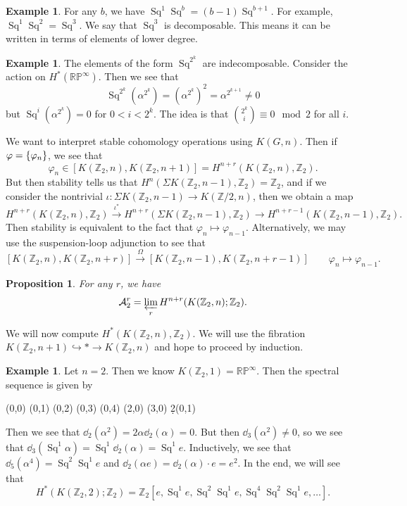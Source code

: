 \documentclass[leqno, openany]{memoir}
\newtheorem{prop}[thm]{Proposition}
\theoremstyle{definition}
\newtheorem{exm}[thm]{Example}
\theoremstyle{remark}
\theoremstyle{plain}
\theoremstyle{definition}
\theoremstyle{remark}
\newcommand{\R}{\mathbb{R}}
\newcommand{\Z}{\mathbb{Z}}
\renewcommand{\P}{\mathbb{P}}
\newcommand{\mc}[1]{\mathcal{#1}}
\DeclareMathOperator{\Sq}{Sq}
\begin{document}
\begin{exm}
    For any $b$, we have $\Sq^1 \Sq^b = (b-1) \Sq^{b+1}$. For example, $\Sq^1 \Sq^2 = \Sq^3$. We say that $\Sq^3$ is decomposable. This means it can be written in terms of elements of lower degree.
\end{exm}

\begin{exm}
    The elements of the form $\Sq^{2^k}$ are indecomposable. Consider the action on $H^*(\R\P^{\infty})$. Then we see that
    \[ \Sq^{2^k}(\alpha^{2^k}) = {(\alpha^{2^k})}^2 = \alpha^{2^{k+1}} \neq 0 \]
    but $\Sq^i (\alpha^{2^k})=  0$ for $0 < i < 2^k$. The idea is that $\binom{2^k}{i} \equiv 0 \mod 2$ for all $i$.
\end{exm}

We want to interpret stable cohomology operations using $K(G, n)$. Then if $\varphi = \qty{\varphi_n}$, we see that
\[ \varphi_n \in [K(\Z_2, n),K(\Z_2, n+1)] = H^{n+r}(K(\Z_2, n), \Z_2). \]
But then stability tells us that $H^n(\Sigma K(\Z_2, n-1), \Z_2) = \Z_2$, and if we consider the nontrivial $\iota \colon \Sigma K(\Z_2, n-1) \to K(\Z/2, n)$, then we obtain a map
\[ H^{n+r}(K(\Z_2, n), \Z_2) \xrightarrow{\iota^*} H^{n+r}(\Sigma K(\Z_2, n-1), \Z_2) \to H^{n+r-1}(K(\Z_2, n-1), \Z_2). \]
Then stability is equivalent to the fact that $\varphi_n \mapsto \varphi_{n-1}$. Alternatively, we may use the suspension-loop adjunction to see that
\[ [K(\Z_2, n), K(\Z_2, n+r)] \xrightarrow{\Omega} [K(\Z_2, n-1), K(\Z_2, n+r-1)] \qquad \varphi_n \mapsto \varphi_{n-1}. \]

\begin{prop}
    For any $r$, we have 
    \[ \mc{A}_2^r = \varprojlim_{r} H^{n+r}(K(\Z_2, n); \Z_2). \]
\end{prop}

We will now compute $H^*(K(\Z_2, n), \Z_2)$. We will use the fibration $K(\Z_2, n+ 1) \hookrightarrow * \to K(\Z_2, n)$ and hope to proceed by induction.

\begin{exm}
    Let $n = 2$. Then we know $K(\Z_2, 1) = \R \P^{\infty}$. Then the spectral sequence is given by
    \begin{center}
        \begin{sseqdata}[classes={draw=none}, name=kz22, cohomological Serre grading]
            \class["1"](0,0)
            \class["\alpha"](0,1)
            \class["\alpha^2"](0,2)
            \class["\alpha^3"](0,3)
            \class["\alpha^2"](0,4)
            \class["e"](2,0)
            \class["\Sq^1 e"](3,0)
            \d2(0,1)
        \end{sseqdata}
        \printpage[name=kz22, page=2, grid=chess]
    \end{center}
    Then we see that $\dd_2(\alpha^2) = 2 \alpha \dd_2(\alpha) = 0$. But then $\dd_3(\alpha^2) \neq 0$, so we see that $\dd_3(\Sq^1 \alpha) = \Sq^1 \dd_2(\alpha) = \Sq^1 e$. Inductively, we see that $\dd_5(\alpha^4) = \Sq^2 \Sq^1 e$ and $\dd_2(\alpha e) = \dd_2 (\alpha) \cdot e = e^2$. In the end, we will see that
    \[ H^*(K(\Z_2, 2); \Z_2) = \Z_2 [ e, \Sq^1 e, \Sq^2 \Sq^1 e, \Sq^4 \Sq^2 \Sq^1 e, \ldots ]. \]
\end{exm}
\end{document}

